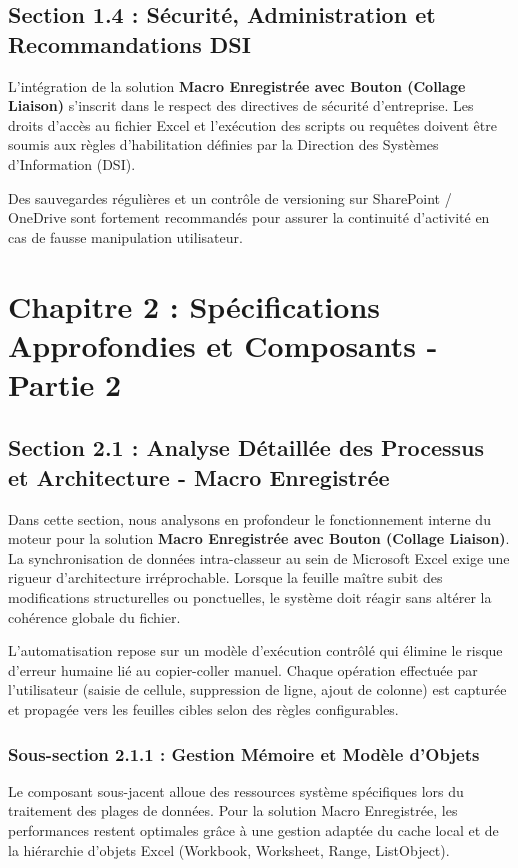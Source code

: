 \documentclass[12pt,a4paper]{report}
\begin{document}
\section{Section 1.4 : Sécurité, Administration et Recommandations DSI}
L'intégration de la solution \textbf{Macro Enregistrée avec Bouton (Collage Liaison)} s'inscrit dans le respect des directives de sécurité d'entreprise. Les droits d'accès au fichier Excel et l'exécution des scripts ou requêtes doivent être soumis aux règles d'habilitation définies par la Direction des Systèmes d'Information (DSI).

Des sauvegardes régulières et un contrôle de versioning sur SharePoint / OneDrive sont fortement recommandés pour assurer la continuité d'activité en cas de fausse manipulation utilisateur.


\chapter{Chapitre 2 : Spécifications Approfondies et Composants - Partie 2}

\section{Section 2.1 : Analyse Détaillée des Processus et Architecture - Macro Enregistrée}
Dans cette section, nous analysons en profondeur le fonctionnement interne du moteur pour la solution \textbf{Macro Enregistrée avec Bouton (Collage Liaison)}. La synchronisation de données intra-classeur au sein de Microsoft Excel exige une rigueur d'architecture irréprochable. Lorsque la feuille maître subit des modifications structurelles ou ponctuelles, le système doit réagir sans altérer la cohérence globale du fichier.

L'automatisation repose sur un modèle d'exécution contrôlé qui élimine le risque d'erreur humaine lié au copier-coller manuel. Chaque opération effectuée par l'utilisateur (saisie de cellule, suppression de ligne, ajout de colonne) est capturée et propagée vers les feuilles cibles selon des règles configurables.


\subsection{Sous-section 2.1.1 : Gestion Mémoire et Modèle d'Objets}
Le composant sous-jacent alloue des ressources système spécifiques lors du traitement des plages de données. Pour la solution Macro Enregistrée, les performances restent optimales grâce à une gestion adaptée du cache local et de la hiérarchie d'objets Excel (Workbook, Worksheet, Range, ListObject).
\end{document}
